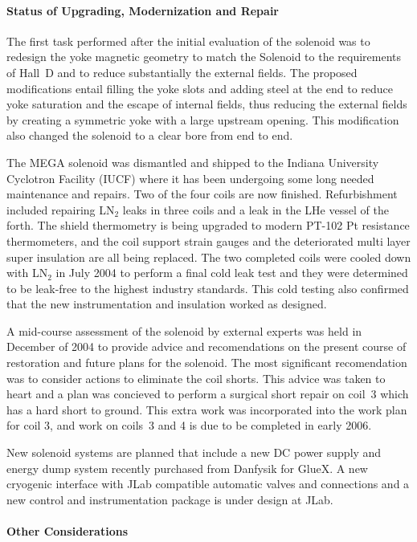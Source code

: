 \documentclass[11pt]{article}
\begin{document}
\paragraph{Status of Upgrading, Modernization and Repair}

 The first task
performed after the initial evaluation of the solenoid was to redesign the
yoke magnetic geometry to match the Solenoid to the requirements of Hall~D
and to reduce substantially the external fields. The proposed modifications
entail filling the yoke slots and adding steel at the end to reduce yoke
saturation and the escape of internal fields, thus reducing the external
fields by creating a symmetric yoke with a large upstream opening. This
modification also changed the solenoid to a clear bore from end to end.

The MEGA solenoid was dismantled and shipped to the
Indiana University Cyclotron Facility (IUCF) where it has been 
undergoing some long needed maintenance and repairs. Two of the four
coils are now finished. Refurbishment included repairing LN$_2$ leaks in three coils and a leak
in the LHe vessel of the forth. The shield thermometry is being upgraded to
modern PT-102 Pt resistance thermometers, and the coil support
strain gauges and the deteriorated multi layer super insulation are all being replaced.
The two completed coils were cooled down with
LN$_2$ in July 2004 to perform a final cold leak test and they were
determined to be leak-free to the highest industry standards. This cold testing also 
confirmed that the new instrumentation and insulation worked as designed. 

A mid-course assessment of the solenoid by external experts was held in December of 2004 to
provide advice and recomendations on the present course of restoration and future 
plans for the solenoid. The most significant recomendation was to consider actions 
to eliminate the coil shorts. This advice was taken to heart and a plan was 
concieved to perform a surgical short repair on coil~3 which has a  
hard short to ground. This extra work was incorporated into the work plan for coil 3,
and work on coils~3 and 4 is due to be completed in early 2006.

New solenoid systems are planned that include a new DC power
supply and energy dump system recently purchased from Danfysik for GlueX.
A new cryogenic interface with JLab compatible automatic valves and
connections and a new control and instrumentation package is under design at JLab.

\paragraph{Other Considerations}
\end{document}
